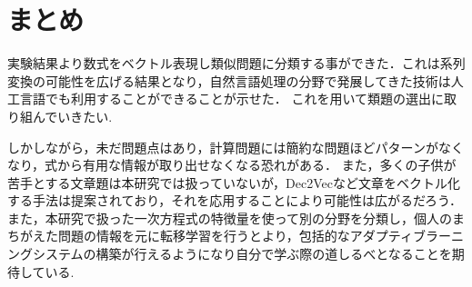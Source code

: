 \documentclass[a4paper,twocolumn]{jsarticle}
\begin{document}
\section{まとめ} \label{sec:future}
実験結果より数式をベクトル表現し類似問題に分類する事ができた．これは系列変換の可能性を広げる結果となり，自然言語処理の分野で発展してきた技術は人工言語でも利用することができることが示せた．
これを用いて類題の選出に取り組んでいきたい.

しかしながら，未だ問題点はあり，計算問題には簡約な問題ほどパターンがなくなり，式から有用な情報が取り出せなくなる恐れがある．
また，多くの子供が苦手とする文章題は本研究では扱っていないが，Dec2Vec\cite{Mohler2014AND}など文章をベクトル化する手法は提案されており，それを応用することにより可能性は広がるだろう．
また，本研究で扱った一次方程式の特徴量を使って別の分野を分類し，個人のまちがえた問題の情報を元に転移学習を行うとより，包括的なアダプティブラーニングシステムの構築が行えるようになり自分で学ぶ際の道しるべとなることを期待している.



\end{document}

